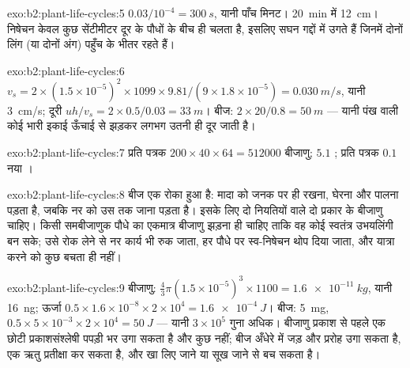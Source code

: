 \begin{solution}{exo:b2:plant-life-cycles:5}
$0.03/10^{-4} = \qty{300}{s}$, यानी पाँच मिनट। \qty{20}{min} में
\qty{12}{cm}। निषेचन केवल कुछ सेंटीमीटर दूर के पौधों के बीच ही चलता है,
इसलिए  सघन गद्दों में उगते हैं जिनमें दोनों लिंग (या दोनों अंग)
पहुँच के भीतर रहते हैं।
\end{solution}

\begin{solution}{exo:b2:plant-life-cycles:6}
$v_s = 2\times(1.5\times 10^{-5})^2\times 1099\times 9.81/(9\times
1.8\times 10^{-5}) = \qty{0.030}{m/s}$, यानी \qty{3}{cm/s}; दूरी $uh/v_s
= 2\times 0.5/0.03 = \qty{33}{m}$। बीज: $2\times 20/0.8 =
\qty{50}{m}$ --- यानी पंख वाली कोई भारी इकाई ऊँचाई से झड़कर लगभग उतनी
ही दूर जाती है।
\end{solution}

\begin{solution}{exo:b2:plant-life-cycles:7}
प्रति पत्रक $200\times 40\times 64 = \num{512000}$ बीजाणु; $5.1$
; प्रति पत्रक $0.1$ नया ।
\end{solution}

\begin{solution}{exo:b2:plant-life-cycles:8}
बीज एक रोका हुआ  है: मादा  को जनक पर ही
रखना, घेरना और पालना पड़ता है, जबकि नर  को
उस तक जाना पड़ता है। इसके लिए दो नियतियों वाले दो प्रकार के बीजाणु
चाहिए। किसी समबीजाणुक पौधे का एकमात्र बीजाणु झड़ना ही चाहिए ताकि वह कोई
स्वतंत्र उभयलिंगी  बन सके; उसे रोक लेने से नर कार्य भी रुक
जाता, हर पौधे पर स्व-निषेचन थोप दिया जाता, और यात्रा करने को कुछ
बचता ही नहीं।
\end{solution}

\begin{solution}{exo:b2:plant-life-cycles:9}
बीजाणु: $\tfrac43\pi(1.5\times 10^{-5})^3\times 1100 =
\qty{1.6e-11}{kg}$, यानी \qty{16}{ng}; ऊर्जा $0.5\times 1.6\times
10^{-8}\times 2\times 10^{4} = \qty{1.6e-4}{J}$। बीज: \qty{5}{mg},
$0.5\times 5\times 10^{-3}\times 2\times 10^{4} = \qty{50}{J}$ ---
यानी $3\times 10^{5}$ गुना अधिक। बीजाणु प्रकाश से पहले एक छोटी
प्रकाशसंश्लेषी पपड़ी भर उगा सकता है और कुछ नहीं; बीज अँधेरे में जड़ और
प्ररोह उगा सकता है, एक ऋतु प्रतीक्षा कर सकता है, और खा लिए जाने या सूख
जाने से बच सकता है।
\end{solution}

